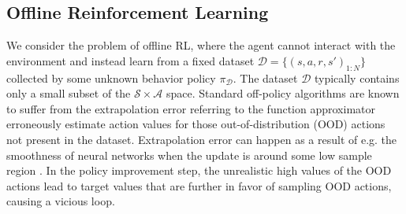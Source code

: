 \documentclass{article}
\newcommand{\datasetPolicy}{\pi_{\mathcal{D}}}
\begin{document}




\subsection{Offline Reinforcement Learning}

We consider the problem of offline RL, where the agent cannot interact with the environment and instead learn from a fixed dataset $\mathcal{D} = \{(s,a,r,s')_{1:N}\}$ collected by some unknown behavior policy $\datasetPolicy$.
The dataset $\mathcal{D}$ typically contains only a small subset of the $\mathcal{S}\times \mathcal{A}$ space.
Standard off-policy algorithms are known to suffer from the extrapolation error referring to the function approximator erroneously estimate action values for those out-of-distribution (OOD) actions not present in the dataset.
Extrapolation error can happen as a result of e.g. the smoothness of neural networks when the update is around some low sample region \cite{Gulcehre2021-regularizedBehavior}.
In the policy improvement step, the unrealistic high values of the OOD actions lead to target values that are further in favor of sampling OOD actions, causing a vicious loop. 
\end{document}
